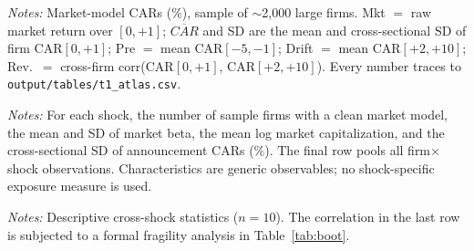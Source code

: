 \documentclass[12pt]{article}
\begin{document}
\FloatBarrier
\newpage
\begin{table}[htbp]\centering
\begin{threeparttable}
\caption{The 2022--2025 policy-shock atlas}\label{tab:atlas}\scriptsize

\begin{tablenotes}\scriptsize\item \textit{Notes:} Market-model CARs (\%), sample of $\sim$2{,}000
large firms. Mkt $=$ raw market return over $[0,+1]$; $\overline{CAR}$ and SD are the mean and
cross-sectional SD of firm CAR$[0,+1]$; Pre $=$ mean CAR$[-5,-1]$; Drift $=$ mean CAR$[+2,+10]$;
Rev.\ $=$ cross-firm corr(CAR$[0,+1]$, CAR$[+2,+10]$). Every number traces to
\texttt{output/tables/t1\_atlas.csv}.
\end{tablenotes}
\end{threeparttable}
\end{table}

\begin{table}[htbp]\centering
\begin{threeparttable}
\caption{Sample summary statistics (observable firm characteristics)}\label{tab:sumstats}\small

\begin{tablenotes}\small\item \textit{Notes:} For each shock, the number of sample firms with a clean
market model, the mean and SD of market beta, the mean log market capitalization, and the
cross-sectional SD of announcement CARs (\%). The final row pools all firm$\times$shock observations.
Characteristics are generic observables; no shock-specific exposure measure is used.
\end{tablenotes}
\end{threeparttable}
\end{table}

\begin{table}[htbp]\centering
\begin{threeparttable}
\caption{Meta-statistics across the ten shocks}\label{tab:meta}\small

\begin{tablenotes}\small\item \textit{Notes:} Descriptive cross-shock statistics ($n=10$). The
correlation in the last row is subjected to a formal fragility analysis in Table~\ref{tab:boot}.
\end{tablenotes}
\end{threeparttable}
\end{table}
\end{document}
